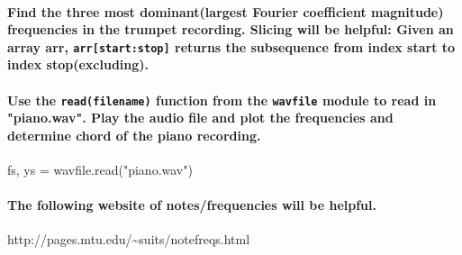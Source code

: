 \documentclass[11pt]{article}
\newenvironment{Shaded}{}{}
\newcommand{\StringTok}[1]{\textcolor[rgb]{0.25,0.44,0.63}{{#1}}}
\newcommand{\NormalTok}[1]{{#1}}
\newcommand{\OperatorTok}[1]{\textcolor[rgb]{0.40,0.40,0.40}{{#1}}}
\begin{document}
    \paragraph{\texorpdfstring{Find the three most dominant(largest Fourier
coefficient magnitude) frequencies in the trumpet recording. Slicing
will be helpful: Given an array arr, \texttt{arr{[}start:stop{]}}
returns the subsequence from index start to index
stop(excluding).}{Find the three most dominant(largest Fourier coefficient magnitude) frequencies in the trumpet recording. Slicing will be helpful: Given an array arr, arr{[}start:stop{]} returns the subsequence from index start to index stop(excluding).}}\label{find-the-three-most-dominantlargest-fourier-coefficient-magnitude-frequencies-in-the-trumpet-recording.-slicing-will-be-helpful-given-an-array-arr-arrstartstop-returns-the-subsequence-from-index-start-to-index-stopexcluding.}

    \paragraph{\texorpdfstring{Use the \texttt{read(filename)} function from
the \texttt{wavfile} module to read in "piano.wav". Play the audio file
and plot the frequencies and determine chord of the piano
recording.}{Use the read(filename) function from the wavfile module to read in "piano.wav". Play the audio file and plot the frequencies and determine chord of the piano recording.}}\label{use-the-readfilename-function-from-the-wavfile-module-to-read-in-piano.wav.-play-the-audio-file-and-plot-the-frequencies-and-determine-chord-of-the-piano-recording.}

\begin{Shaded}
\begin{Highlighting}[]
\NormalTok{fs, ys }\OperatorTok{=}\NormalTok{ wavfile.read(}\StringTok{"piano.wav"}\NormalTok{)}
\end{Highlighting}
\end{Shaded}

\paragraph{The following website of notes/frequencies will be
helpful.}\label{the-following-website-of-notesfrequencies-will-be-helpful.}

http://pages.mtu.edu/\textasciitilde{}suits/notefreqs.html


    
    
    
    
\end{document}
